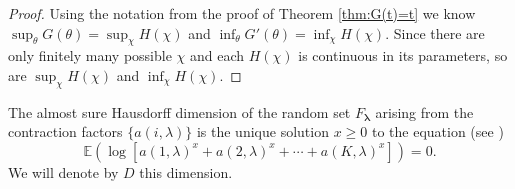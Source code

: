 \documentclass{amsart}
\theoremstyle{plain}
\numberwithin{equation}{section}
\newcommand{\blambda}{{\boldsymbol{\lambda}}}
\newcommand{\ee}{{\mathbb E}}
\begin{document}
\begin{proof}
Using the notation from the proof of Theorem \ref{thm:G(t)=t} we know $\sup_\theta G(\theta) = \sup_\chi H(\chi)$ and $\inf_\theta G'(\theta) = \inf_\chi H(\chi)$.
Since there are only finitely many possible $\chi$ and each $H(\chi)$ is continuous in its parameters, so are $\sup_\chi H(\chi)$ and $\inf_\chi H(\chi)$.
\end{proof}




The almost sure Hausdorff dimension of the random set $F_\blambda$ arising from the contraction factors $\{a(i,\lambda)\}$ is the unique solution $x \ge 0$ to the equation (see \cite{Ham})
\begin{equation}
           \ee(\log [a(1,\lambda)^{x}+a(2,\lambda)^{x}+\cdots +a(K,\lambda)^{x}])=0.
    \label{eq:ASHausdorff}
\end{equation}
We will denote by $D$ this dimension.
\end{document}
